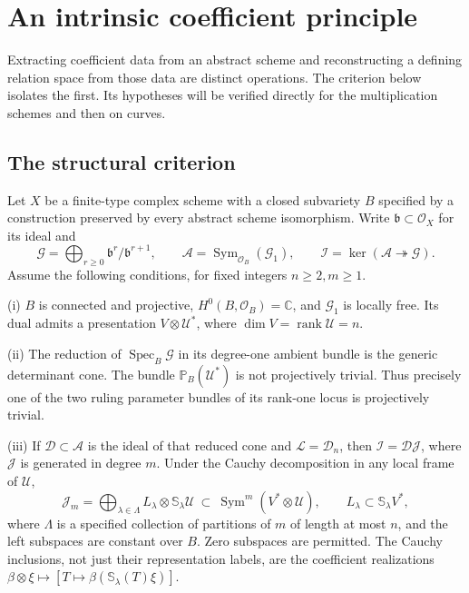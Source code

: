 \documentclass[11pt,reqno]{amsart}
\numberwithin{equation}{section}
\theoremstyle{definition}\newtheorem{definition}[theorem]{Definition}
\theoremstyle{remark}\newtheorem{remark}[theorem]{Remark}
\newcommand{\C}{\mathbb C}\newcommand{\Q}{\mathbb Q}
\newcommand{\Pj}{\mathbb P}\newcommand{\A}{\mathbb A}
\newcommand{\OO}{\mathcal O}\newcommand{\II}{\mathcal I}
\DeclareMathOperator{\Sym}{Sym}\DeclareMathOperator{\Gr}{Gr}
\DeclareMathOperator{\rank}{rank}\DeclareMathOperator{\Proj}{Proj}
\DeclareMathOperator{\Spec}{Spec}\DeclareMathOperator{\PGL}{PGL}
\begin{document}

\section{An intrinsic coefficient principle}
\label{sec:structural-coefficient-principle}

Extracting coefficient data from an abstract scheme and reconstructing
a defining relation space from those data are distinct operations.
The criterion below isolates the first.  Its hypotheses will be
verified directly for the multiplication schemes and then on curves.

\subsection{The structural criterion}

Let \(X\) be a finite-type complex scheme with a closed subvariety
\(B\) specified by a construction preserved by every abstract scheme
isomorphism.  Write \(\mathfrak b\subset\OO_X\) for its ideal and
\[
 \mathcal G=\bigoplus_{r\ge0}\mathfrak b^r/\mathfrak b^{r+1},
 \qquad \mathcal A=\Sym_{\OO_B}(\mathcal G_1),
 \qquad \mathcal I=\ker(\mathcal A\twoheadrightarrow\mathcal G).
\]
Assume the following conditions, for fixed integers \(n\ge2,m\ge1\).

\smallskip
\noindent\textup{(i)} \(B\) is connected and projective,
\(H^0(B,\OO_B)=\C\), and \(\mathcal G_1\) is locally free.
Its dual admits a presentation \(V\otimes\mathcal U^*\), where
\(\dim V=\rank\mathcal U=n\).

\smallskip
\noindent\textup{(ii)} The reduction of \(\Spec_B\mathcal G\)
in its degree-one ambient bundle is the generic determinant cone.
The bundle \(\Pj_B(\mathcal U^*)\) is not projectively trivial.
Thus precisely one of the two ruling parameter bundles of its rank-one
locus is projectively trivial.

\smallskip
\noindent\textup{(iii)} If \(\mathcal D\subset\mathcal A\)
is the ideal of that reduced cone and \(\mathcal L=\mathcal D_n\),
then \(\mathcal I=\mathcal D\mathcal J\), where
\(\mathcal J\) is generated in degree \(m\).  Under the Cauchy
decomposition in any local frame of \(\mathcal U\),
\begin{equation}\label{eq:structural-coefficient-hypothesis}
 \mathcal J_m=
 \bigoplus_{\lambda\in\Lambda}
          L_\lambda\otimes\mathbb S_\lambda\mathcal U
 \ \subset\
 \Sym^m(V^*\otimes\mathcal U),
 \qquad L_\lambda\subset\mathbb S_\lambda V^*,
\end{equation}
where \(\Lambda\) is a specified collection of partitions of \(m\)
of length at most \(n\), and the left subspaces are constant over
\(B\).  Zero subspaces are permitted.  The Cauchy inclusions, not
just their representation labels, are the coefficient realizations
\(\beta\otimes\xi\mapsto[T\mapsto\beta(\mathbb S_\lambda(T)\xi)]\).
\end{document}
